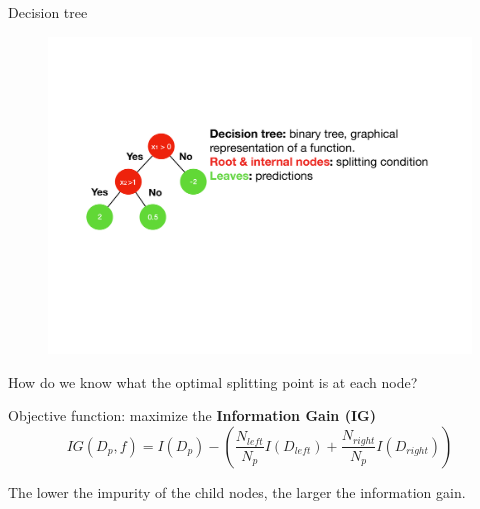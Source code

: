 \documentclass[notes]{beamer}          %
\begin{document}
\begin{frame}{Decision tree}
\begin{figure}
  \includegraphics[width=\linewidth]{figures/week_6/tree-example-c.pdf}  
\endminipage
\end{figure}

How do we know what the optimal splitting point is at each node? \newline

Objective function: maximize the \textbf{Information Gain (IG)}
\begin{equation*}
IG(D_p,f) = I(D_p) - (\frac{N_{left}}{N_p}I(D_{left}) + \frac{N_{right}}{N_p} I(D_{right}))
\end{equation*}

The lower the impurity of the child nodes, the larger the information gain.

\end{frame}
\end{document}
